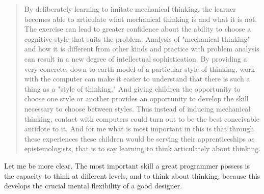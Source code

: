 \begin{quotation}
        By deliberately learning to imitate mechanical thinking, the learner becomes
    able to articulate what mechanical thinking is and what it is not. The
    exercise can lead to greater confidence about the ability to choose a
    cognitive style that suits the problem.  Analysis of "mechanical thinking"
    and how it is different from other kinds and practice with problem analysis
    can result in a new degree of intellectual sophistication. By providing a
    very concrete, down-to-earth model of a particular style of thinking, work
    with the computer can make it easier to understand that there is such a
    thing as a "style of thinking." And giving children the opportunity to
    choose one style or another provides an opportunity to develop the skill
    necessary to choose between styles. Thus instead of inducing mechanical
    thinking, contact with computers could turn out to be the best conceivable
    antidote to it. And for me what is most important in this is that through
    these experiences these children would be serving their apprenticeships as
    epistemologists, that is to say learning to think articulately about
    thinking.
\end{quotation}

Let me be more clear. The most important skill a great programmer possess is the
capacity to think at different levels, and to think about thinking, because this
develops the crucial mental flexibility of a good designer.
\cite{education:spolsky__the_perils_of_java_schools}
